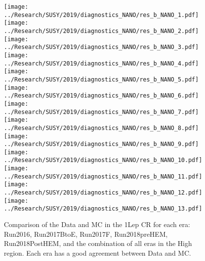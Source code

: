 \begin{figure}[!htb]
	\begin{center}  
  \texttt{[image: ../Research/SUSY/2019/diagnostics\_NANO/res\_b\_NANO\_1.pdf]}
  \texttt{[image: ../Research/SUSY/2019/diagnostics\_NANO/res\_b\_NANO\_2.pdf]} 
  \texttt{[image: ../Research/SUSY/2019/diagnostics\_NANO/res\_b\_NANO\_3.pdf]} \\
  \texttt{[image: ../Research/SUSY/2019/diagnostics\_NANO/res\_b\_NANO\_4.pdf]}
  \texttt{[image: ../Research/SUSY/2019/diagnostics\_NANO/res\_b\_NANO\_5.pdf]} 
  \texttt{[image: ../Research/SUSY/2019/diagnostics\_NANO/res\_b\_NANO\_6.pdf]} \\
  \texttt{[image: ../Research/SUSY/2019/diagnostics\_NANO/res\_b\_NANO\_7.pdf]}
  \texttt{[image: ../Research/SUSY/2019/diagnostics\_NANO/res\_b\_NANO\_8.pdf]} 
  \texttt{[image: ../Research/SUSY/2019/diagnostics\_NANO/res\_b\_NANO\_9.pdf]} \\
  \texttt{[image: ../Research/SUSY/2019/diagnostics\_NANO/res\_b\_NANO\_10.pdf]}
  \texttt{[image: ../Research/SUSY/2019/diagnostics\_NANO/res\_b\_NANO\_11.pdf]} 
  \texttt{[image: ../Research/SUSY/2019/diagnostics\_NANO/res\_b\_NANO\_12.pdf]}     
  \texttt{[image: ../Research/SUSY/2019/diagnostics\_NANO/res\_b\_NANO\_13.pdf]} \\ 
	\end{center}
	\caption{Comparison of the Data and MC in the 1Lep CR for each era: Run2016, Run2017BtoE, Run2017F, Run2018preHEM, Run2018PostHEM, and the combination of all eras in the High \dm{} region. Each era has a good agreement between Data and MC. 
	 }
	\label{fig:qcd-1lcr-datavsmc-hm-inclusive}
\end{figure}
